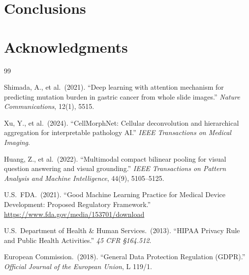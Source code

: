 \documentclass[11pt,a4paper]{article}
\begin{document}
\section{Conclusions}
\label{sec:conclusions}


\section*{Acknowledgments}

\begin{thebibliography}{99}

Shimada, A., et al.\ (2021).
``Deep learning with attention mechanism for predicting mutation burden in gastric cancer from whole slide images.''
\textit{Nature Communications}, 12(1), 5515.

Xu, Y., et al.\ (2024).
``CellMorphNet: Cellular deconvolution and hierarchical aggregation for interpretable pathology AI.''
\textit{IEEE Transactions on Medical Imaging}.

Huang, Z., et al.\ (2022).
``Multimodal compact bilinear pooling for visual question answering and visual grounding.''
\textit{IEEE Transactions on Pattern Analysis and Machine Intelligence}, 44(9), 5105–5125.

U.S.\ FDA.\ (2021).
``Good Machine Learning Practice for Medical Device Development: Proposed Regulatory Framework.''
\url{https://www.fda.gov/media/153701/download}

U.S.\ Department of Health \& Human Services.\ (2013).
``HIPAA Privacy Rule and Public Health Activities.''
\textit{45 CFR \S164.512}.

European Commission.\ (2018).
``General Data Protection Regulation (GDPR).''
\textit{Official Journal of the European Union}, L 119/1.

\end{thebibliography}
\end{document}
